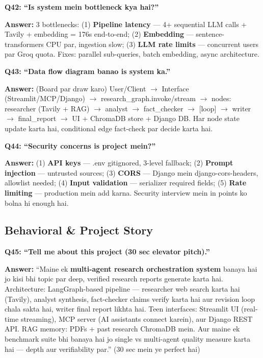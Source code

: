 \begin{interviewbox}
\textbf{Q42: ``Is system mein bottleneck kya hai?''}

\textbf{Answer:} 3 bottlenecks: (1) \textbf{Pipeline latency} --- 4+ sequential LLM calls + Tavily + embedding = 176s end-to-end; (2) \textbf{Embedding} --- sentence-transformers CPU par, ingestion slow; (3) \textbf{LLM rate limits} --- concurrent users par Groq quota. Fixes: parallel sub-queries, batch embedding, async architecture.
\end{interviewbox}

\begin{interviewbox}
\textbf{Q43: ``Data flow diagram banao is system ka.''}

\textbf{Answer:} (Board par draw karo) User/Client $\rightarrow$ Interface (Streamlit/MCP/Django) $\rightarrow$ research\_graph.invoke/stream $\rightarrow$ nodes: researcher (Tavily + RAG) $\rightarrow$ analyst $\rightarrow$ fact\_checker $\rightarrow$ [loop] $\rightarrow$ writer $\rightarrow$ final\_report $\rightarrow$ UI + ChromaDB store + Django DB. Har node state update karta hai, conditional edge fact-check par decide karta hai.
\end{interviewbox}

\begin{interviewbox}
\textbf{Q44: ``Security concerns is project mein?''}

\textbf{Answer:} (1) \textbf{API keys} --- .env gitignored, 3-level fallback; (2) \textbf{Prompt injection} --- untrusted sources; (3) \textbf{CORS} --- Django mein django-cors-headers, allowlist needed; (4) \textbf{Input validation} --- serializer required fields; (5) \textbf{Rate limiting} --- production mein add karna. Security interview mein in points ko bolna hi enough hai.
\end{interviewbox}

\subsection{Behavioral \& Project Story}

\begin{interviewbox}
\textbf{Q45: ``Tell me about this project (30 sec elevator pitch).''}

\textbf{Answer:} ``Maine ek \textbf{multi-agent research orchestration system} banaya hai jo kisi bhi topic par deep, verified research reports generate karta hai. Architecture: LangGraph-based pipeline --- researcher web search karta hai (Tavily), analyst synthesis, fact-checker claims verify karta hai aur revision loop chala sakta hai, writer final report likhta hai. Teen interfaces: Streamlit UI (real-time streaming), MCP server (AI assistants connect karein), aur Django REST API. RAG memory: PDFs + past research ChromaDB mein. Aur maine ek benchmark suite bhi banaya hai jo single vs multi-agent quality measure karta hai --- depth aur verifiability par.'' (30 sec mein ye perfect hai)
\end{interviewbox}

